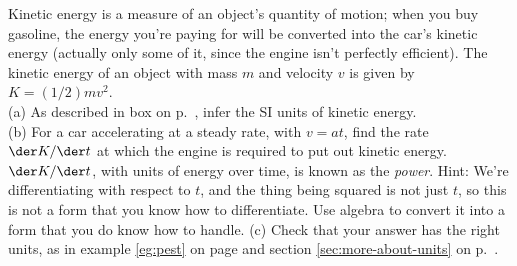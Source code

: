Kinetic energy is a measure of an object's quantity of motion; when you buy gasoline,  the
energy you're paying for will be converted into the car's kinetic energy (actually only some of
it, since the engine isn't perfectly efficient). The kinetic energy of an object with mass
$m$ and velocity $v$ is given by $K=(1/2)mv^2$.\\
(a) As described in box  on p.~\pageref{fig:units}, infer the SI units of kinetic energy.\\
(b) For a car accelerating at a steady rate, with
$v=at$, find the rate $\der K/\der t$ at which the engine is required to put out kinetic energy.
$\der K/\der t$, with units of energy over time, is known as the \emph{power}.
Hint: We're differentiating with respect to $t$, and the thing being squared is not
just $t$, so this is not a form that you know how to differentiate. Use algebra
to convert it into a form that you do know how to handle.\answercheck\hwendpart
(c) Check that your answer has the right units, as in example \ref{eg:pest} on page \pageref{eg:pest}
and section \ref{sec:more-about-units} on p.~\pageref{sec:more-about-units}.

